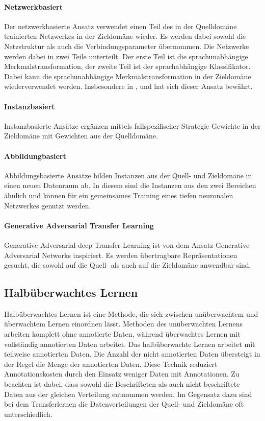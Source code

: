 		\paragraph{Netzwerkbasiert} Der netzwerkbasierte Ansatz verwendet einen Teil des in der Quelldomäne trainierten Netzwerkes in der Zieldomäne wieder. Es werden dabei sowohl die Netzstruktur als auch die Verbindungsparameter übernommen. Die Netzwerke werden dabei in zwei Teile unterteilt. Der erste Teil ist die sprachunabhängige Merkmalstransformation, der zweite Teil ist der sprachabhängige Klassifikator. Dabei kann die sprachunabhängige Merkmalstransformation in der Zieldomäne wiederverwendet werden. Insbesondere in \cite{JasonYosinski.2014}, \cite{Long.2016} und \cite{George.2018} hat sich dieser Ansatz bewährt.     
		     
		\paragraph{Instanzbasiert} Instanzbasierte Ansätze ergänzen mittels fallspezifischer Strategie Gewichte in der Zieldomäne mit Gewichten aus der Quelldomäne.
		
		\paragraph{Abbildungbasiert} Abbildungsbasierte Ansätze bilden Instanzen aus der Quell- und Zieldomäne in einen neuen Datenraum ab. In diesem sind die Instanzen aus den zwei Bereichen ähnlich und können für ein gemeinsames Training eines tiefen neuronalen Netzwerkes genutzt werden. 
		
		\paragraph{Generative Adversarial Transfer Learning} Generative Adversarial deep Transfer Learning ist von dem Ansatz Generative Adversarial Networks \cite{IanJ.Goodfellow.2014} inspiriert. Es werden übertragbare Repräsentationen gesucht, die sowohl auf die Quell- als auch auf die Zieldomäne anwendbar sind.

		\subsection{Halbüberwachtes Lernen}
		Halbüberwachtes Lernen ist eine Methode, die sich zwischen unüberwachtem und überwachtem Lernen einordnen lässt. Methoden des unüberwachten Lernens arbeiten komplett ohne annotierte Daten, während überwachtes Lernen mit vollständig annotierten Daten arbeitet. Das halbüberwachte Lernen arbeitet mit teilweise annotierten Daten. Die Anzahl der nicht annotierten Daten übersteigt in der Regel die Menge der annotierten Daten. Diese Technik reduziert Annotationskosten durch den Einsatz weniger Daten mit Annotationen. Zu beachten ist dabei, dass sowohl die Beschrifteten als auch nicht beschriftete Daten aus der gleichen Verteilung entnommen werden. 
		Im Gegensatz dazu sind bei dem Transferlernen die Datenverteilungen der Quell- und Zieldomäne oft unterschiedlich.
		\cite{Chapelle.2010} 
				
